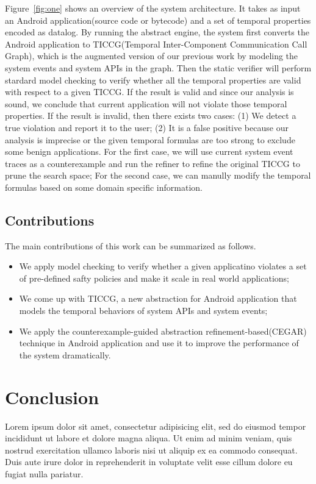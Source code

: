 \documentclass{article}
\begin{document}
Figure~\ref{fig:one} shows an overview of the system architecture.
It takes as input an Android application(source code or bytecode) 
and a set of temporal properties encoded as datalog. By running the 
abstract engine, the system first converts the Android application 
to TICCG(Temporal Inter-Component Communication Call Graph), 
which is the augmented version of our previous work\cite{apposcopy}
by modeling the system events and system APIs in the graph. 
Then the static verifier will perform stardard model checking to 
verify whether all the temporal properties are valid with respect 
to a given TICCG. If the result is valid and since our analysis is 
sound, we conclude that current application will not violate those
temporal properties. If the result is invalid, then there exists two
cases: (1) We detect a true violation and report it to the user; 
(2) It is a false positive because our analysis is imprecise or the 
given temporal formulas are too strong to exclude some benign applications.
For the first case, we will use current system event traces as a counterexample
\cite{clarkecegar} and  run the refiner to refine the original 
TICCG to prune the search space; For the second case, we can manully
modify the temporal formulas based on some domain specific information.


\subsection{Contributions}
The main contributions of this work can be summarized as follows.
\begin{itemize}
\item We apply model checking to verify whether a given applicatino violates
a set of pre-defined safty policies and make it scale in real world 
applications;
\item We come up with TICCG, a new abstraction for Android application
that models the temporal behaviors of system APIs and system events;
\item We apply the counterexample-guided abstraction refinement-based(CEGAR) 
technique in Android application and use it to improve the performance 
of the system dramatically.
\end{itemize}



\section{Conclusion}

Lorem ipsum dolor sit amet, consectetur adipisicing elit, sed do eiusmod tempor
incididunt ut labore et dolore magna aliqua. Ut enim ad minim veniam, quis
nostrud exercitation ullamco laboris nisi ut aliquip ex ea commodo consequat.
Duis aute irure dolor in reprehenderit in voluptate velit esse cillum dolore eu
fugiat nulla pariatur.
%
%
 
\end{document}
